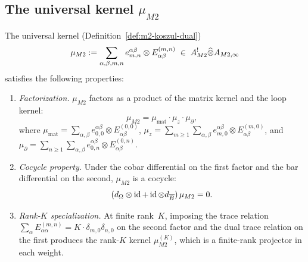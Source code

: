\subsection{The universal kernel \texorpdfstring{$\mu_{M2}$}{mu\_\{M2\}}}

\begin{theorem}
The universal kernel (Definition~\ref{def:m2-koszul-dual})
\[
\mu_{M2}
:=
\sum_{\alpha,\beta,m,n}
e^{\alpha\beta}_{m,n} \otimes E^{(m,n)}_{\alpha\beta}
\;\in\;
A^!_{M2}\widehat{\otimes} A_{M2,\infty}
\]
satisfies the following properties:
\begin{enumerate}[label=(\roman*),leftmargin=1.8em]
\item \emph{Factorization.} $\mu_{M2}$ factors as a product
of the matrix kernel and the loop kernel:
\begin{equation}%
\mu_{M2}
= \mu_{\mathrm{mat}}\cdot\mu_{z}\cdot\mu_{\partial},
\end{equation}
where
$\mu_{\mathrm{mat}}
= \sum_{\alpha,\beta}e^{\alpha\beta}_{0,0}\otimes E^{(0,0)}_{\alpha\beta}$,
$\mu_z
= \sum_{m\ge 1}\sum_{\alpha,\beta}
e^{\alpha\beta}_{m,0}\otimes E^{(m,0)}_{\alpha\beta}$,
and
$\mu_\partial
= \sum_{n\ge 1}\sum_{\alpha,\beta}
e^{\alpha\beta}_{0,n}\otimes E^{(0,n)}_{\alpha\beta}$.

\item \emph{Cocycle property.}
Under the cobar differential on the first factor and the
bar differential on the second, $\mu_{M2}$ is a cocycle:
\begin{equation}%
(d_{\Cobar}\otimes\id + \id\otimes d_{\barB})\,\mu_{M2}
= 0.
\end{equation}

\item \emph{Rank-$K$ specialization.} At finite rank~$K$,
imposing the trace relation
$\sum_\alpha E^{(m,n)}_{\alpha\alpha} = K\cdot\delta_{m,0}\delta_{n,0}$
on the second factor and the dual trace relation on the first
produces the rank-$K$ kernel $\mu_{M2}^{(K)}$, which is a
finite-rank projector in each weight.
\end{enumerate}
\end{theorem}

